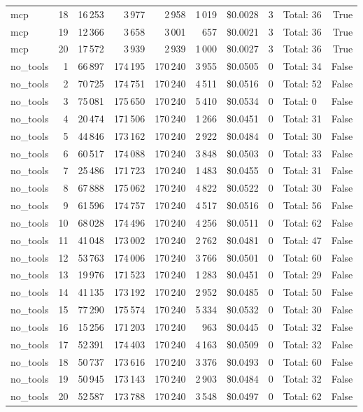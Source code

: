 \documentclass[a4paper,11pt]{article}
\begin{document}
\begin{table}[H]
{\begin{tabular}{l r r r r r r r l r}
mcp & 18 & 16\,253 & 3\,977 & 2\,958 & 1\,019 & \$0.0028 & 3 & Total: 36 & True \\
mcp & 19 & 12\,366 & 3\,658 & 3\,001 & 657 & \$0.0021 & 3 & Total: 36 & True \\
mcp & 20 & 17\,572 & 3\,939 & 2\,939 & 1\,000 & \$0.0027 & 3 & Total: 36 & True \\
\midrule
no\_tools & 1 & 66\,897 & 174\,195 & 170\,240 & 3\,955 & \$0.0505 & 0 & Total: 34 & False \\
no\_tools & 2 & 70\,725 & 174\,751 & 170\,240 & 4\,511 & \$0.0516 & 0 & Total: 52 & False \\
no\_tools & 3 & 75\,081 & 175\,650 & 170\,240 & 5\,410 & \$0.0534 & 0 & Total: 0 & False \\
no\_tools & 4 & 20\,474 & 171\,506 & 170\,240 & 1\,266 & \$0.0451 & 0 & Total: 31 & False \\
no\_tools & 5 & 44\,846 & 173\,162 & 170\,240 & 2\,922 & \$0.0484 & 0 & Total: 30 & False \\
no\_tools & 6 & 60\,517 & 174\,088 & 170\,240 & 3\,848 & \$0.0503 & 0 & Total: 33 & False \\
no\_tools & 7 & 25\,486 & 171\,723 & 170\,240 & 1\,483 & \$0.0455 & 0 & Total: 31 & False \\
no\_tools & 8 & 67\,888 & 175\,062 & 170\,240 & 4\,822 & \$0.0522 & 0 & Total: 30 & False \\
no\_tools & 9 & 61\,596 & 174\,757 & 170\,240 & 4\,517 & \$0.0516 & 0 & Total: 56 & False \\
no\_tools & 10 & 68\,028 & 174\,496 & 170\,240 & 4\,256 & \$0.0511 & 0 & Total: 62 & False \\
no\_tools & 11 & 41\,048 & 173\,002 & 170\,240 & 2\,762 & \$0.0481 & 0 & Total: 47 & False \\
no\_tools & 12 & 53\,763 & 174\,006 & 170\,240 & 3\,766 & \$0.0501 & 0 & Total: 60 & False \\
no\_tools & 13 & 19\,976 & 171\,523 & 170\,240 & 1\,283 & \$0.0451 & 0 & Total: 29 & False \\
no\_tools & 14 & 41\,135 & 173\,192 & 170\,240 & 2\,952 & \$0.0485 & 0 & Total: 50 & False \\
no\_tools & 15 & 77\,290 & 175\,574 & 170\,240 & 5\,334 & \$0.0532 & 0 & Total: 30 & False \\
no\_tools & 16 & 15\,256 & 171\,203 & 170\,240 & 963 & \$0.0445 & 0 & Total: 32 & False \\
no\_tools & 17 & 52\,391 & 174\,403 & 170\,240 & 4\,163 & \$0.0509 & 0 & Total: 32 & False \\
no\_tools & 18 & 50\,737 & 173\,616 & 170\,240 & 3\,376 & \$0.0493 & 0 & Total: 60 & False \\
no\_tools & 19 & 50\,945 & 173\,143 & 170\,240 & 2\,903 & \$0.0484 & 0 & Total: 32 & False \\
no\_tools & 20 & 52\,587 & 173\,788 & 170\,240 & 3\,548 & \$0.0497 & 0 & Total: 62 & False \\
\bottomrule
\end{tabular}}
\end{table}
\end{document}
